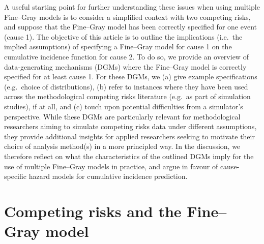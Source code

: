 \documentclass[
  letterpaper,
  paper=240mm:170mm,
  twoside=true,
  open=right,
  fontsize=10pt,
  pagesize=false,
  BCOR=15mm,
  DIV=14,
  headinclude=true,
  footinclude=false,
  headsepline=on]{scrbook}
\begin{document}
A useful starting point for further understanding these issues when
using multiple Fine--Gray models is to consider a simplified context
with two competing risks, and suppose that the Fine--Gray model has been
correctly specified for one event (cause 1). The objective of this
article is to outline the implications (i.e.~the implied assumptions) of
specifying a Fine--Gray model for cause 1 on the cumulative incidence
function for cause 2. To do so, we provide an overview of
data-generating mechanisms (DGMs) where the Fine--Gray model is
correctly specified for at least cause 1. For these DGMs, we (a) give
example specifications (e.g.~choice of distributions), (b) refer to
instances where they have been used across the methodological competing
risks literature (e.g.~as part of simulation studies), if at all, and
(c) touch upon potential difficulties from a simulator's perspective.
While these DGMs are particularly relevant for methodological
researchers aiming to simulate competing risks data under different
assumptions, they provide additional insights for applied researchers
seeking to motivate their choice of analysis method(s) in a more
principled way. In the discussion, we therefore reflect on what the
characteristics of the outlined DGMs imply for the use of multiple
Fine--Gray models in practice, and argue in favour of cause-specific
hazard models for cumulative incidence prediction.

\section{Competing risks and the Fine--Gray
model}\label{competing-risks-and-the-finegray-model}
\end{document}
